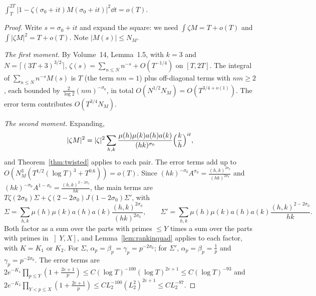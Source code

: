 \begin{proposition}\label{prop:mollmeansq}
$\displaystyle\int_T^{2T}\bigl|1-\zeta(\sigma_0+it)M(\sigma_0+it)\bigr|^2\dd t=o(T)$.
\end{proposition}
\begin{proof}
Write $s=\sigma_0+it$ and expand the square: we need $\int\zeta M=T+o(T)$ and $\int|\zeta M|^2=T+o(T)$. Note $|M(s)|\le N_M$.

\emph{The first moment.} By Volume~14, Lemma~1.5, with $k=3$ and $N=\lceil(3T+3)^{3/2}\rceil$, $\zeta(s)=\sum_{n\le N}n^{-s}+O(T^{-1/4})$ on $[T,2T]$. The integral of $\sum_{n\le N}n^{-s}M(s)$ is $T$ (the term $nm=1$) plus off-diagonal terms with $nm\ge2$, each bounded by $\frac{2}{\log 2}(nm)^{-\sigma_0}$, in total $O(N^{1/2}N_M)=O(T^{3/4+o(1)})$. The error term contributes $O(T^{3/4}N_M)$.

\emph{The second moment.} Expanding,
\[
|\zeta M|^2=|\zeta|^2\sum_{h,k}\frac{\mu(h)\mu(k)a(h)a(k)}{(hk)^{\sigma_0}}\Bigl(\frac kh\Bigr)^{it},
\]
and Theorem~\ref{thm:twisted} applies to each pair. The error terms add up to $O(N_M^3(T^{1/2}(\log T)^3+T^{0.6}))=o(T)$. Since $(hk)^{-\sigma_0}A^{\sigma_0}=\frac{(h,k)^{2\sigma_0}}{(hk)^{2\sigma_0}}$ and $(hk)^{-\sigma_0}A^{1-\sigma_0}=\frac{(h,k)^{2-2\sigma_0}}{hk}$, the main terms are $T\zeta(2\sigma_0)\Sigma+\zeta(2-2\sigma_0)J(1-2\sigma_0)\Sigma'$, with
\[
\Sigma=\sum_{h,k}\mu(h)\mu(k)a(h)a(k)\frac{(h,k)^{2\sigma_0}}{(hk)^{2\sigma_0}},\qquad\Sigma'=\sum_{h,k}\mu(h)\mu(k)a(h)a(k)\frac{(h,k)^{2-2\sigma_0}}{hk}.
\]
Both factor as a sum over the parts with primes $\le Y$ times a sum over the parts with primes in $\left]Y,X\right]$, and Lemma~\ref{lem:rankinquad} applies to each factor, with $K=K_1$ or $K_2$. For $\Sigma$, $\alpha_p=\beta_p=\gamma_p=p^{-2\sigma_0}$; for $\Sigma'$, $\alpha_p=\beta_p=\frac1p$ and $\gamma_p=p^{-2\sigma_0}$. The error terms are $2e^{-K_1}\prod_{p\le Y}(1+\frac{2e+1}p)\le C(\log T)^{-100}(\log T)^{2e+1}\le C(\log T)^{-93}$ and $2e^{-K_2}\prod_{Y<p\le X}(1+\frac{2e+1}p)\le CL_2^{-100}(L_2^2)^{2e+1}\le CL_2^{-87}$.


\end{proof}
